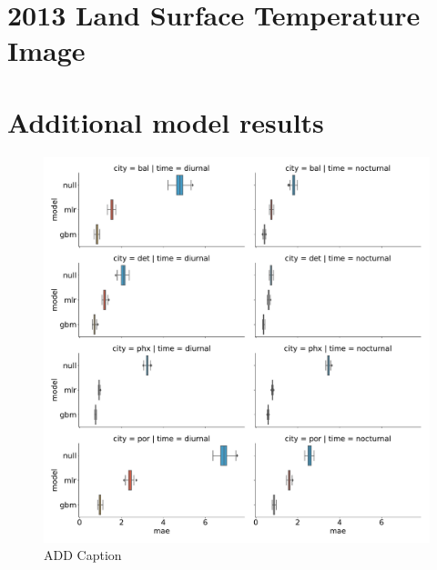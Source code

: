 \documentclass[]{elsarticle}
\begin{document}


\appendix
\section{2013 Land Surface Temperature Image}


\section{Additional model results}
\begin{figure}[h]
\begin{center}
\includegraphics[width=\textwidth]{fig/report/holdout_results_mae.pdf}
\caption{ADD Caption}
\label{fig:cityholdout_errors}
\end{center}
\end{figure}
\end{document}

